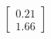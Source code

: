 \documentclass[preview]{standalone}
\begin{document}
\begin{align*}
\begin{bmatrix} 0.21 \\ 1.66 \end{bmatrix}
\end{align*}
\end{document}
